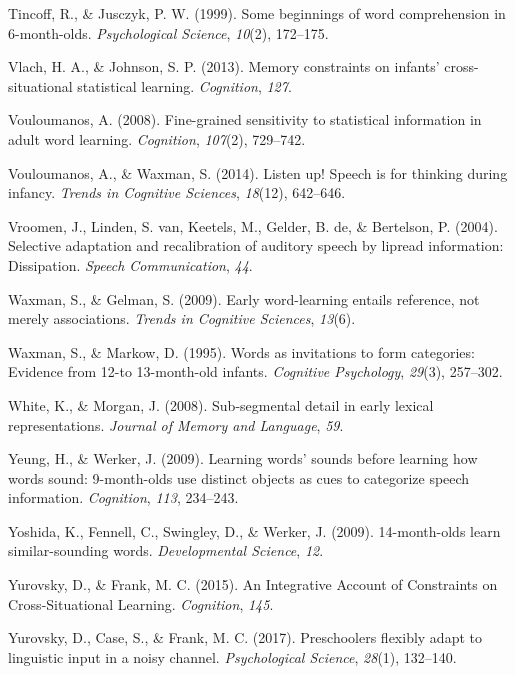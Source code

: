 \documentclass[english,,man,floatsintext]{apa6}
\theoremstyle{definition}
\theoremstyle{definition}
\theoremstyle{definition}
\theoremstyle{remark}
\begin{document}
\hypertarget{ref-tincoff1999}{}
Tincoff, R., \& Jusczyk, P. W. (1999). Some beginnings of word
comprehension in 6-month-olds. \emph{Psychological Science},
\emph{10}(2), 172--175.

\hypertarget{ref-vlach2013}{}
Vlach, H. A., \& Johnson, S. P. (2013). Memory constraints on infants'
cross-situational statistical learning. \emph{Cognition}, \emph{127}.

\hypertarget{ref-vouloumanos2008}{}
Vouloumanos, A. (2008). Fine-grained sensitivity to statistical
information in adult word learning. \emph{Cognition}, \emph{107}(2),
729--742.

\hypertarget{ref-vouloumanos2014}{}
Vouloumanos, A., \& Waxman, S. (2014). Listen up! Speech is for thinking
during infancy. \emph{Trends in Cognitive Sciences}, \emph{18}(12),
642--646.

\hypertarget{ref-vroomen2004}{}
Vroomen, J., Linden, S. van, Keetels, M., Gelder, B. de, \& Bertelson,
P. (2004). Selective adaptation and recalibration of auditory speech by
lipread information: Dissipation. \emph{Speech Communication},
\emph{44}.

\hypertarget{ref-waxman2009}{}
Waxman, S., \& Gelman, S. (2009). Early word-learning entails reference,
not merely associations. \emph{Trends in Cognitive Sciences},
\emph{13}(6).

\hypertarget{ref-waxman1995}{}
Waxman, S., \& Markow, D. (1995). Words as invitations to form
categories: Evidence from 12-to 13-month-old infants. \emph{Cognitive
Psychology}, \emph{29}(3), 257--302.

\hypertarget{ref-white2008b}{}
White, K., \& Morgan, J. (2008). Sub-segmental detail in early lexical
representations. \emph{Journal of Memory and Language}, \emph{59}.

\hypertarget{ref-yeung09}{}
Yeung, H., \& Werker, J. (2009). Learning words' sounds before learning
how words sound: 9-month-olds use distinct objects as cues to categorize
speech information. \emph{Cognition}, \emph{113}, 234--243.

\hypertarget{ref-yoshida2009}{}
Yoshida, K., Fennell, C., Swingley, D., \& Werker, J. (2009).
14-month-olds learn similar-sounding words. \emph{Developmental
Science}, \emph{12}.

\hypertarget{ref-yurovsky2015}{}
Yurovsky, D., \& Frank, M. C. (2015). An Integrative Account of
Constraints on Cross-Situational Learning. \emph{Cognition}, \emph{145}.

\hypertarget{ref-yurovsky2017}{}
Yurovsky, D., Case, S., \& Frank, M. C. (2017). Preschoolers flexibly
adapt to linguistic input in a noisy channel. \emph{Psychological
Science}, \emph{28}(1), 132--140.
\end{document}
